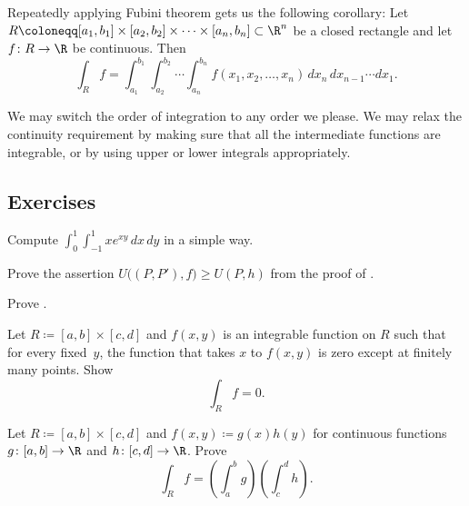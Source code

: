 Repeatedly applying Fubini theorem gets us the following
corollary:
Let $R \coloneqq [a_1,b_1] \times [a_2,b_2] \times \cdots \times [a_n,b_n] \subset
\R^n$ be a closed rectangle and let
$f \colon R \to \R$ be continuous.  Then
\begin{equation*}
\int_R f = 
\int_{a_1}^{b_1}
\int_{a_2}^{b_2}
\cdots
\int_{a_n}^{b_n}
f(x_1,x_2,\ldots,x_n)
\,
dx_n
\,
dx_{n-1}
\cdots
dx_1 .
\end{equation*}

We may switch the order of integration to any order we please.
We may relax the continuity requirement by making sure that all the
intermediate functions are integrable, or by using upper or lower integrals
appropriately.

\subsection{Exercises}

\begin{exercise}
Compute $\int_{0}^1 \int_{-1}^1 xe^{xy} \, dx \, dy$ in a simple way.
\end{exercise}

\begin{exercise}
Prove the assertion
$U\bigl((P,P'),f\bigr) \geq U(P,h)$ from the proof
of .
\end{exercise}

\begin{exercise}[Easy]
Prove .
\end{exercise}

\begin{exercise}
Let $R \coloneqq [a,b] \times [c,d]$ and $f(x,y)$ is an integrable
function on $R$ such that
for every fixed~$y$, the function that takes $x$ to $f(x,y)$
is zero except at finitely many points.  Show
\begin{equation*}
\int_R f = 0 .
\end{equation*}
\end{exercise}

\begin{exercise}
Let $R \coloneqq [a,b] \times [c,d]$ and $f(x,y) \coloneqq g(x)h(y)$ for continuous
functions $g \colon [a,b] \to \R$ and
$h \colon [c,d] \to \R$.  Prove
\begin{equation*}
\int_R f = \left(\int_a^b g\right)\left(\int_c^d h\right) .
\end{equation*}
\end{exercise}

